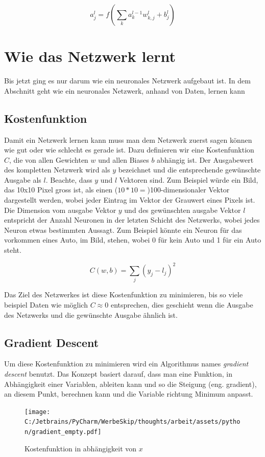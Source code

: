 \documentclass[12pt,a4paper]{report}
\begin{document}
\[a^l_j = f\left(\sum_{k} a^{l-1}_k w^l_{k,j} + b^l_j\right)\]

\section{Wie das Netzwerk lernt}\label{sec:lernen}
Bis jetzt ging es nur darum wie ein neuronales Netzwerk aufgebaut ist.
In dem Abschnitt geht wie ein neuronales Netzwerk, anhand von Daten, lernen kann
\subsection{Kostenfunktion}
Damit ein Netzwerk lernen kann muss man dem Netzwerk zuerst sagen können wie gut oder wie schlecht es gerade ist.
Dazu definieren wir eine Kostenfunktion $C$, die von allen Gewichten $w$ und allen Biases $b$ abhängig ist.
Der Ausgabewert des kompletten Netzwerk wird als $y$ bezeichnet und die entsprechende gewünschte Ausgabe als $l$.
Beachte, dass $y$ und $l$ Vektoren sind.
Zum Beispiel würde ein Bild, das 10x10 Pixel gross ist, als einen ($10 * 10 =$)100-dimensionaler Vektor dargestellt werden,
wobei jeder Eintrag im Vektor der Grauwert eines Pixels ist.
Die Dimension vom ausgabe Vektor $y$ und des gewünschten ausgabe Vektor $l$ entspricht der Anzahl Neuronen in der letzten Schicht des Netzwerks,
wobei jedes Neuron etwas bestimmten Aussagt.
Zum Beispiel könnte ein Neuron für das vorkommen eines Auto, im Bild, stehen, wobei 0 für kein Auto und 1 für ein Auto steht.

\[C(w,b) = \sum_{j}(y_j - l_j)^2\]

Das Ziel des Netzwerkes ist diese Kostenfunktion zu minimieren, bis so viele beispiel Daten wie möglich $C \approx 0$ entsprechen,
dies geschieht wenn die Ausgabe des Netzwerks und die gewünschte Ausgabe ähnlich ist.
\subsection{Gradient Descent}
Um diese Kostenfunktion zu minimieren wird ein Algorithmus names \textit{gradient descent} benutzt.
Das Konzept basiert darauf, dass man eine Funktion, in Abhängigkeit einer Variablen, ableiten kann und so die Steigung (eng. gradient),
an diesem Punkt, berechnen kann und die Variable richtung Minimum anpasst.

\begin{figure}[h]%
    \centering
    \texttt{[image: C:/Jetbrains/PyCharm/WerbeSkip/thoughts/arbeit/assets/python/gradient\_empty.pdf]} %
    \caption{Kostenfunktion in abhängigkeit von $x$}%
    \label{fig:grad1}%
\end{figure}
\end{document}
